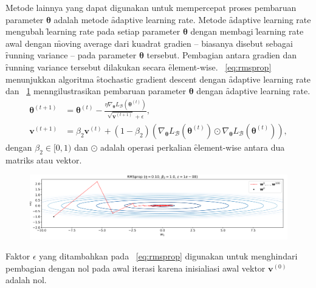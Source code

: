 Metode lainnya yang dapat digunakan untuk mempercepat proses pembaruan parameter $\bm{\theta}$ adalah metode \f{adaptive learning rate}. Metode \f{adaptive learning rate} mengubah \f{learning rate} pada setiap parameter $\bm{\theta}$ dengan membagi \f{learning rate} awal dengan \f{moving average} dari kuadrat gradien -- biasanya disebut sebagai \f{running variance} -- pada parameter $\bm{\theta}$ tersebut. Pembagian antara gradien dan \f{running variance} tersebut dilakukan secara \f{element-wise}. \equ~\ref{eq:rmsprop} menunjukkan algoritma \f{stochastic gradient descent} dengan \f{adaptive learning rate} dan \pic~\ref{fig:rmsprop} menngilustrasikan pembaruan parameter $\bm{\theta}$ dengan \f{adaptive learning rate}.
\begin{align}
    \label{eq:rmsprop}
    \bm{\theta}^{(t+1)} &= \bm{\theta}^{(t)} - \frac{\eta \nabla_{\bm{\theta}} L_{\mathcal{B}}(\bm{\theta}^{(t)})}{\sqrt{\mathbf{v}^{(t+1)}} + \epsilon}, \\
    \mathbf{v}^{(t+1)} &= \beta_2 \mathbf{v}^{(t)} + (1 - \beta_2) \left(\nabla_{\bm{\theta}} L_{\mathcal{B}}(\bm{\theta}^{(t)})\odot \nabla_{\bm{\theta}} L_{\mathcal{B}}(\bm{\theta}^{(t)})\right),
\end{align}
dengan $\beta_2 \in [0, 1)$ dan $\odot$ adalah operasi perkalian \f{element-wise} antara dua matriks atau vektor.
\begin{figure}[!ht]
    \centering
    \includegraphics[width=1\textwidth]{assets/pics/RMSPROP.png}
    \label{fig:rmsprop}
\end{figure}

Faktor $\epsilon$ yang ditambahkan pada \equ~\ref{eq:rmsprop} digunakan untuk menghindari pembagian dengan nol pada awal iterasi karena inisialiasi awal vektor $\mathbf{v}^{(0)}$ adalah nol.

